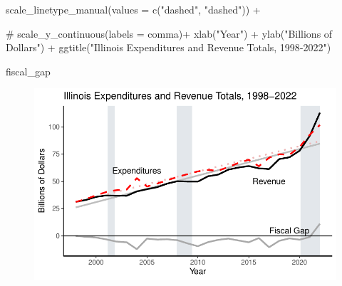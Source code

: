 \documentclass[
  letterpaper,
  DIV=11,
  numbers=noendperiod]{scrreport}
\newenvironment{Shaded}{\begin{snugshade}}{\end{snugshade}}
\newcommand{\AttributeTok}[1]{\textcolor[rgb]{0.40,0.45,0.13}{#1}}
\newcommand{\CommentTok}[1]{\textcolor[rgb]{0.37,0.37,0.37}{#1}}
\newcommand{\FunctionTok}[1]{\textcolor[rgb]{0.28,0.35,0.67}{#1}}
\newcommand{\NormalTok}[1]{\textcolor[rgb]{0.00,0.23,0.31}{#1}}
\newcommand{\SpecialCharTok}[1]{\textcolor[rgb]{0.37,0.37,0.37}{#1}}
\newcommand{\StringTok}[1]{\textcolor[rgb]{0.13,0.47,0.30}{#1}}
\begin{document}
\begin{Shaded}
\begin{Highlighting}[]
    \FunctionTok{scale\_linetype\_manual}\NormalTok{(}\AttributeTok{values =} \FunctionTok{c}\NormalTok{(}\StringTok{"dashed"}\NormalTok{, }\StringTok{"dashed"}\NormalTok{)) }\SpecialCharTok{+}

\CommentTok{\#  scale\_y\_continuous(labels = comma)+}
  \FunctionTok{xlab}\NormalTok{(}\StringTok{"Year"}\NormalTok{) }\SpecialCharTok{+} 
  \FunctionTok{ylab}\NormalTok{(}\StringTok{"Billions of Dollars"}\NormalTok{)  }\SpecialCharTok{+}
  \FunctionTok{ggtitle}\NormalTok{(}\StringTok{"Illinois Expenditures and Revenue Totals, 1998{-}2022"}\NormalTok{)}

\NormalTok{fiscal\_gap}
\end{Highlighting}
\end{Shaded}

\begin{figure}[H]

{\centering \includegraphics{./Everything_files/figure-pdf/fiscal-gap-1.pdf}

}

\end{figure}
\end{document}
